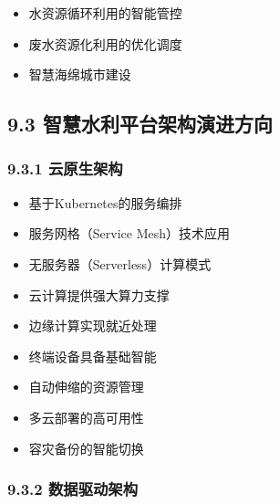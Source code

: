 
\begin{itemize}
\tightlist
\item
  水资源循环利用的智能管控
\item
  废水资源化利用的优化调度
\item
  智慧海绵城市建设
\end{itemize}

\hypertarget{ux667aux6167ux6c34ux5229ux5e73ux53f0ux67b6ux6784ux6f14ux8fdbux65b9ux5411}{%
\subsection{9.3 智慧水利平台架构演进方向}\label{ux667aux6167ux6c34ux5229ux5e73ux53f0ux67b6ux6784ux6f14ux8fdbux65b9ux5411}}

\hypertarget{ux4e91ux539fux751fux67b6ux6784}{%
\subsubsection{9.3.1 云原生架构}\label{ux4e91ux539fux751fux67b6ux6784}}


\begin{itemize}
\tightlist
\item
  基于Kubernetes的服务编排
\item
  服务网格（Service Mesh）技术应用
\item
  无服务器（Serverless）计算模式
\end{itemize}


\begin{itemize}
\tightlist
\item
  云计算提供强大算力支撑
\item
  边缘计算实现就近处理
\item
  终端设备具备基础智能
\end{itemize}


\begin{itemize}
\tightlist
\item
  自动伸缩的资源管理
\item
  多云部署的高可用性
\item
  容灾备份的智能切换
\end{itemize}

\hypertarget{ux6570ux636eux9a71ux52a8ux67b6ux6784}{%
\subsubsection{9.3.2 数据驱动架构}\label{ux6570ux636eux9a71ux52a8ux67b6ux6784}}

